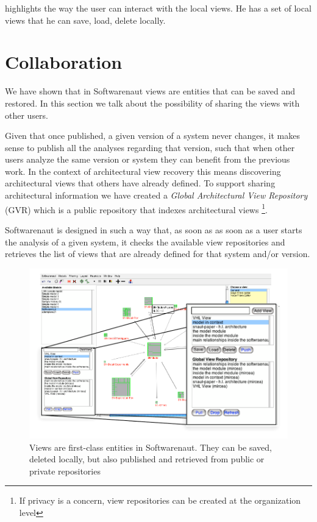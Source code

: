 \documentclass[preprint,12pt]{elsarticle}
\begin{document}
 highlights the way the user can interact with the local views. He has a set of local views that he can save, load, delete locally. 


\newpage
\section {Collaboration}
\label {sec:collab}

We have shown that in Softwarenaut views are entities that can be saved and restored. In this section we talk about the possibility of sharing the views with other users. 

Given that once published, a given version of a system never changes, it makes sense to publish all the analyses regarding that version, such that when other users analyze the same version or system they can benefit from the previous work. In the context of architectural view recovery this means discovering architectural views that others have already defined. To support sharing architectural information we have created a {\em Global Architectural View Repository} (GVR) which is a public repository that indexes architectural views \footnote{If privacy is a concern, view repositories can be created at the organization level}.

Softwarenaut is designed in such a way that, as soon as as soon as a user starts the analysis of a given system, it checks the available view repositories and retrieves the list of views that are already defined for that system and/or version.


\begin{figure}[h]
\begin{center}
\includegraphics[width=0.8\linewidth]{images/ViewOperations.pdf}
\caption{Views are first-class entities in Softwarenaut. They can be saved, deleted locally, but also published and retrieved from public or private repositories}
\end{center}
\end{figure}
\end{document}

